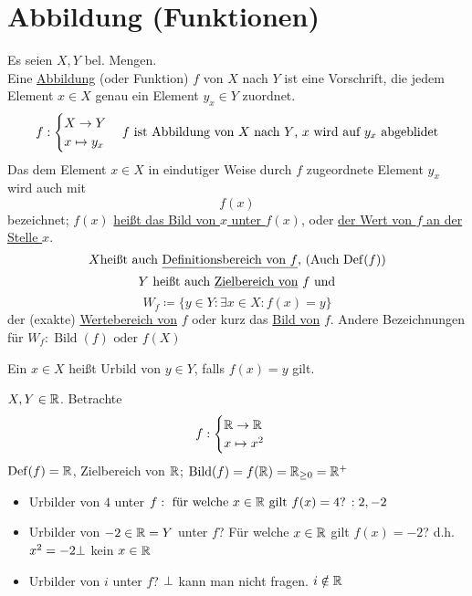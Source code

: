 \documentclass{myclass}
\begin{document}
\section{Abbildung (Funktionen)}

\begin{definition}
	Es seien $ X, Y $ bel. Mengen.\\
	Eine \underline{Abbildung} (oder Funktion) $ f $ von $ X $ nach $ Y $ ist eine Vorschrift, die jedem Element $ x \in X $ genau ein Element $ y_x \in Y $ zuordnet.
	\[ f :
		\begin{cases}
			X \to Y\\
			x \mapsto y_x
		\end{cases}
		f \text{ ist Abbildung von $ X $ nach $ Y $, $ x $ wird auf $ y_x $ abgeblidet}
	\]
	Das dem Element $ x \in X $ in eindutiger Weise durch $ f $ zugeordnete Element $ y_x $ wird auch mit \[ f(x) \] bezeichnet; $ f(x) $ \underline{heißt das Bild von $ x $ unter $ f(x) $}, oder \underline{der Wert von $ f $ an der Stelle $ x $}.
	\[ X \text{heißt auch \underline{Definitionsbereich von $ f $}, (Auch $ \operatorname{Def}(f) $)} \]
	\[ Y \text{ heißt auch \underline{Zielbereich von} $ f $ und} \]
	\[ W_f \coloneqq \{ y \in Y : \exists x \in X : f(x) = y \} \]
	der (exakte) \underline{Wertebereich von} $ f $ oder kurz das \underline{Bild von} $ f $. Andere Bezeichnungen für $ W_f : \operatorname{Bild}(f) \text{ oder } f(X) $\par
	\begin{definition}
		Ein $ x \in X $ heißt Urbild von $ y \in Y $, falls $ f(x) = y $ gilt.
		\begin{example}
			$ X, Y \in \mathbb{R} $. Betrachte \[ f: \begin{cases} \mathbb{R} \to \mathbb{R}\\ x \mapsto x^2 \end{cases} \] $ \operatorname{Def}(f) = \mathbb{R} $, Zielbereich von $ \mathbb{R} $; $ \operatorname{Bild}(f) = f(\mathbb{R}) = \mathbb{R}_{\geq 0} = \mathbb{R}^{+} $
		\end{example}
		\begin{example}
			\begin{itemize}
				\item Urbilder von $ 4 $ unter $ f : \text{ für welche $ x \in \mathbb{R} $ gilt $f(x) = 4 $? $ : 2, -2 $} $
				\item Urbilder von $ -2 \in \mathbb{R} = Y $ unter $ f $? Für welche $ x \in \mathbb{R} $ gilt $ f(x) = -2 $? d.h. $ x^2 = -2 \bot $ kein $ x \in \mathbb{R} $
				\item Urbilder von $ i $ unter $ f $? $ \bot $ kann man nicht fragen. $ i \notin \mathbb{R} $
			\end{itemize}
		\end{example}
	\end{definition}
\end{definition}
\end{document}
